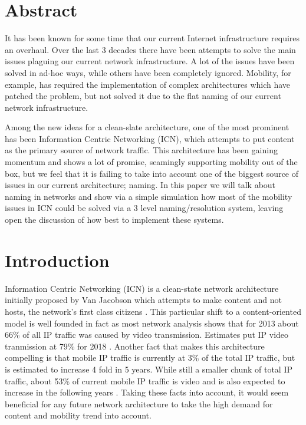\documentclass[8pt,twocolumn]{article}
\begin{document}

\section{Abstract}
It has been known for some time that our current Internet infrastructure
requires an overhaul. Over the last 3 decades there have been attempts to solve
the main issues plaguing our current network infrastructure. A lot of the 
issues have been solved in ad-hoc ways, while others have been completely
ignored. Mobility, for example, has required the implementation of complex
architectures which have patched the problem, but not solved it due to the 
flat naming of our current network infrastructure. 

Among the new ideas for a clean-slate architecture, one of the most
prominent has been Information Centric Networking (ICN), which attempts to put
content as the primary source of network traffic. This architecture has been
gaining momentum and shows a lot of promise, seamingly supporting mobility 
out of the box, but we feel that it is failing to take into account one of the
biggest source of issues in our current architecture; naming. In this paper we
will talk about naming in networks and show via a simple simulation how most
of the mobility issues in ICN could be solved via a 3 level naming/resolution
system, leaving open the discussion of how best to implement these systems. 
 
\section{Introduction}
Information Centric Networking (ICN) is a clean-state network architecture
initially proposed by Van Jacobson which attempts to make content and not
hosts, the network's first class citizens
 \cite{Jacobson:2009:NNC:1658939.1658941}. This particular shift to a
content-oriented model is well founded in fact as most network analysis shows
that for 2013 about 66\% of all IP traffic was caused by video transmission.
Estimates put IP video tranmission at 79\% for 2018 \cite{cisco:2014:Online}.
Another fact that makes this architecture compelling is that mobile IP traffic
is currently at 3\% of the total IP traffic, but is estimated to increase 4
fold in 5 years. While still a smaller chunk of total IP traffic, about 53\% of
current mobile IP traffic is video and is also expected to increase in the 
following years \cite{ciscomobile:2014:Online}. Taking these facts into
account, it would seem beneficial for any future network architecture to
take the high demand for content and mobility trend into account.
\end{document}
